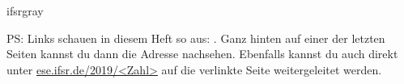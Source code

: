 \bigskip
\begin{awesomeblock}[ifsrgray]{2pt}{\faLightbulb[regular]}{ifsrgray}
    \begin{minipage}[t]{.82\textwidth}
\small PS\@: Links schauen in diesem Heft so aus: . Ganz hinten auf einer der letzten Seiten kannst du dann die Adresse nachsehen. Ebenfalls kannst du auch direkt unter \url{ese.ifsr.de/2019/<Zahl>} auf die verlinkte Seite weitergeleitet werden.
    \end{minipage}
\end{awesomeblock}


